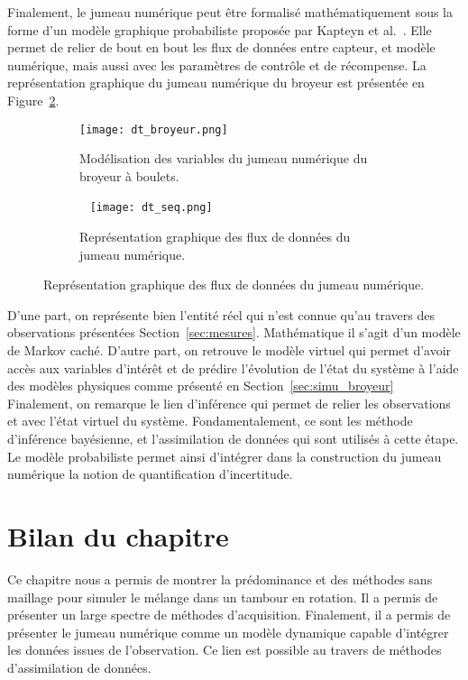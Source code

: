 Finalement, le jumeau numérique peut être formalisé mathématiquement sous la forme d'un modèle graphique probabiliste proposée par Kapteyn et al.~\cite{kapteyn_probabilistic_2021}.
Elle permet de relier de bout en bout les flux de données entre capteur, et modèle numérique, mais aussi avec les paramètres de contrôle et de récompense. La représentation graphique du jumeau numérique du broyeur est présentée en Figure~\ref{fig:graph_dt}.

\begin{figure}
    \centering
    \begin{subfigure}{0.49\textwidth}
        \texttt{[image: dt\_broyeur.png]}
        \caption{Modélisation des variables du jumeau numérique du broyeur à boulets.}
    \end{subfigure}
    \begin{subfigure}{0.49\textwidth}~\label{fig:graph_dt}
        \texttt{[image: dt\_seq.png]}
        \caption{Représentation graphique des flux de données du jumeau numérique.}
    \end{subfigure}
\end{figure}

D'une part, on représente bien l'entité réel qui n'est connue qu'au travers des observations présentées Section~\ref{sec:mesures}. Mathématique il s'agit d'un modèle de Markov caché. D'autre part, on retrouve le modèle virtuel qui permet d'avoir accès aux variables d'intérêt et de prédire l'évolution de l'état du système à l'aide des modèles physiques comme présenté en Section~\ref{sec:simu_broyeur}
Finalement, on remarque le lien d'inférence qui permet de relier les observations et avec l'état virtuel du système. Fondamentalement, ce sont les méthode d'inférence bayésienne, et l'assimilation de données qui sont utilisés à cette étape.
Le modèle probabiliste permet ainsi d'intégrer dans la construction du jumeau numérique la notion de quantification d'incertitude.

\section{Bilan du chapitre}

Ce chapitre nous a permis de montrer la prédominance et des méthodes sans maillage pour simuler le mélange dans un tambour en rotation. Il a permis de présenter un large spectre de méthodes d'acquisition. Finalement, il a permis de présenter le jumeau numérique comme un modèle dynamique capable d'intégrer les données issues de l'observation. Ce lien est possible au travers de méthodes d'assimilation de données.




